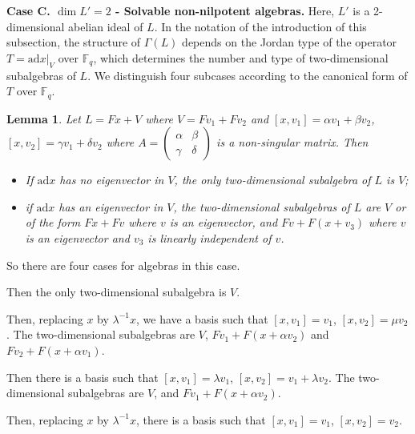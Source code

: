 \documentclass[11pt]{amsart}
\theoremstyle{plain}
\newtheorem{lemma}[theorem]{Lemma}
\def\F{\mathbb{F}}
\def\ad{\mathrm{ad}}
\begin{document}
\textbf{Case C. $\dim L'=2$ - Solvable non-nilpotent algebras.}
Here, $L'$ is a 2-dimensional abelian ideal of $L$. In the notation of the introduction of this subsection, the structure of $\Gamma(L)$ depends on the Jordan type of the operator $T = \ad x |_V$ over $\F_q$, which determines the number and type of two-dimensional subalgebras of $L$. We distinguish four subcases according to the canonical form of $T$ over $\F_q$.

\begin{lemma}\cite[Lemma 4.6]{TZG} \label{2dim-subalgebras}
Let $L=Fx+V$ where $V=Fv_1+Fv_2$ and $[x,v_1]=\alpha v_1+\beta v_2$, $[x,v_2]=\gamma v_1+\delta v_2$ where $A=\left(\begin{matrix} \alpha&\beta\\ \gamma & \delta \end{matrix}\right)$ is a non-singular matrix. Then
\begin{itemize}
\item[(i)] If $\ad x$ has no eigenvector in $V$, the only two-dimensional subalgebra of $L$ is $V$; 
\item[(ii)] if $\ad x$ has an eigenvector in $V$, the two-dimensional subalgebras of $L$ are $V$ or of the form $Fx+Fv$ where $v$ is an eigenvector, and $Fv+F(x+v_3)$ where $v$ is an eigenvector and $v_3$ is linearly independent of $v$.
\end{itemize}
\end{lemma}

\smallskip

So there are four cases for algebras in this case.
\smallskip

 Then the only two-dimensional subalgebra is $V$.  
\smallskip

 Then, replacing $x$ by $\lambda^{-1}x$, we have a basis such that $[x,v_1]=v_1$, $[x,v_2]=\mu v_2$. The two-dimensional subalgebras are $V$, $Fv_1+F(x+\alpha v_2)$ and $Fv_2+F(x+\alpha v_1)$.  

\smallskip

 Then there is a basis such that $[x,v_1]=\lambda v_1$, $[x,v_2]=v_1+\lambda v_2$. The two-dimensional subalgebras are $V$, and $Fv_1+F(x+\alpha v_2)$.  
\smallskip

  Then, replacing $x$ by $\lambda^{-1} x$, there is a basis such that $[x,v_1]=v_1$, $[x,v_2]=v_2$.  
\end{document}
